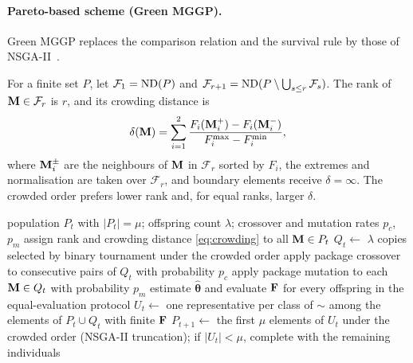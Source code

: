 \paragraph{Pareto-based scheme (Green MGGP).}
Green MGGP replaces the comparison relation and the survival rule by those of NSGA-II~\cite{DPAM2002}.

\begin{definition}\label{def:crowding}
For a finite set $P$, let $\mathcal F_1=\operatorname{ND}(P)$ and $\mathcal F_{r+1}=\operatorname{ND}(P\setminus\bigcup_{s\le r}\mathcal F_s)$.
The rank of $\mathbf{M}\in\mathcal F_r$ is $r$, and its crowding distance is
\begin{equation}
\delta(\mathbf{M})=\sum_{i=1}^{2}\frac{F_i(\mathbf{M}^{+}_i)-F_i(\mathbf{M}^{-}_i)}{F_i^{\max}-F_i^{\min}},
\label{eq:crowding}
\end{equation}
where $\mathbf{M}^{\pm}_i$ are the neighbours of $\mathbf{M}$ in $\mathcal F_r$ sorted by $F_i$, the extremes and normalisation are
taken over $\mathcal F_r$, and boundary elements receive $\delta=\infty$. The crowded order prefers lower rank and,
for equal ranks, larger $\delta$.
\end{definition}

\begin{algorithm}[t]
\caption{One generation of Green MGGP}\label{alg:green}
\begin{algorithmic}[1]
\Require population $P_t$ with $|P_t|=\mu$; offspring count $\lambda$; crossover and mutation rates $p_c$, $p_m$
\State assign rank and crowding distance \eqref{eq:crowding} to all $\mathbf{M}\in P_t$
\State $Q_t\gets$ $\lambda$ copies selected by binary tournament under the crowded order
\State apply package crossover to consecutive pairs of $Q_t$ with probability $p_c$
\State apply package mutation to each $\mathbf{M}\in Q_t$ with probability $p_m$
\State estimate $\hat{\boldsymbol\theta}$ and evaluate $\mathbf{F}$ for every offspring in the equal-evaluation protocol
\State $U_t\gets$ one representative per class of $\sim$ among the elements of $P_t\cup Q_t$ with finite $\mathbf{F}$
\State $P_{t+1}\gets$ the first $\mu$ elements of $U_t$ under the crowded order (NSGA-II truncation); if $|U_t|<\mu$,
complete with the remaining individuals
\end{algorithmic}
\end{algorithm}

